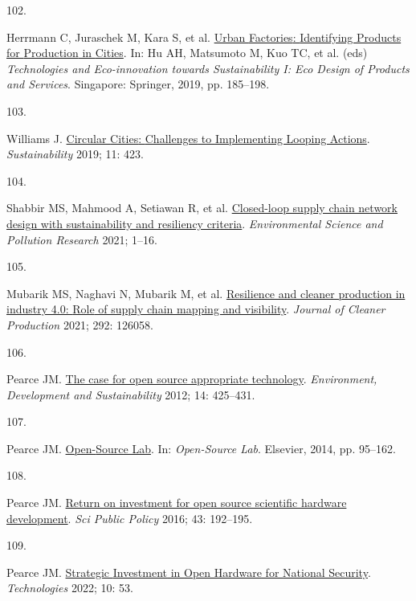 \documentclass[
  11pt,
  a4paperpaper,
  onecolumn]{article}
\newlength{\cslhangindent}
\newlength{\csllabelwidth}
\newlength{\cslentryspacingunit} %
\newenvironment{CSLReferences}[2] %
 {%
  \setlength{\parindent}{0pt}
  \ifodd #1
  \let\oldpar\par
  \def\par{\hangindent=\cslhangindent\oldpar}
  \fi
  \setlength{\parskip}{#2\cslentryspacingunit}
 }%
 {}
\newcommand{\CSLLeftMargin}[1]{\parbox[t]{\csllabelwidth}{#1}}
\newcommand{\CSLRightInline}[1]{\parbox[t]{\linewidth - \csllabelwidth}{#1}\break}
\begin{document}
\begin{CSLReferences}{0}{0}
\leavevmode{}%
\CSLLeftMargin{102. }%
\CSLRightInline{Herrmann C, Juraschek M, Kara S, et al.
\href{https://doi.org/10.1007/978-981-13-1181-9_15}{Urban {Factories}:
{Identifying Products} for {Production} in {Cities}}. In: Hu AH,
Matsumoto M, Kuo TC, et al. (eds) \emph{Technologies and
{Eco-innovation} towards {Sustainability I}: {Eco Design} of {Products}
and {Services}}. {Singapore}: {Springer}, 2019, pp. 185--198.}

\leavevmode{}%
\CSLLeftMargin{103. }%
\CSLRightInline{Williams J.
\href{https://doi.org/10.3390/su11020423}{Circular {Cities}:
{Challenges} to {Implementing Looping Actions}}. \emph{Sustainability}
2019; 11: 423.}

\leavevmode{}%
\CSLLeftMargin{104. }%
\CSLRightInline{Shabbir MS, Mahmood A, Setiawan R, et al.
\href{https://doi.org/10.1007/s11356-021-12980-0}{Closed-loop supply
chain network design with sustainability and resiliency criteria}.
\emph{Environmental Science and Pollution Research} 2021; 1--16.}

\leavevmode{}%
\CSLLeftMargin{105. }%
\CSLRightInline{Mubarik MS, Naghavi N, Mubarik M, et al.
\href{https://doi.org/10.1016/j.jclepro.2021.126058}{Resilience and
cleaner production in industry 4.0: {Role} of supply chain mapping and
visibility}. \emph{Journal of Cleaner Production} 2021; 292: 126058.}

\leavevmode{}%
\CSLLeftMargin{106. }%
\CSLRightInline{Pearce JM.
\href{https://doi.org/10.1007/s10668-012-9337-9}{The case for open
source appropriate technology}. \emph{Environment, Development and
Sustainability} 2012; 14: 425--431.}

\leavevmode{}%
\CSLLeftMargin{107. }%
\CSLRightInline{Pearce JM.
\href{https://doi.org/10.1016/B978-0-12-410462-4.00005-6}{Open-{Source
Lab}}. In: \emph{Open-{Source Lab}}. {Elsevier}, 2014, pp. 95--162.}

\leavevmode{}%
\CSLLeftMargin{108. }%
\CSLRightInline{Pearce JM.
\href{https://doi.org/10.1093/scipol/scv034}{Return on investment for
open source scientific hardware development}. \emph{Sci Public Policy}
2016; 43: 192--195.}

\leavevmode{}%
\CSLLeftMargin{109. }%
\CSLRightInline{Pearce JM.
\href{https://doi.org/10.3390/technologies10020053}{Strategic
{Investment} in {Open Hardware} for {National Security}}.
\emph{Technologies} 2022; 10: 53.}


\end{CSLReferences}
\end{document}
